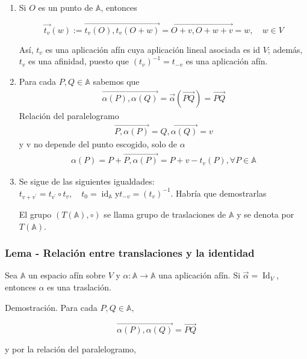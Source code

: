 \documentclass[12pt, a4paper, ones, notitlepage, openany,titlepage]{article}
\begin{document}
\begin{enumerate}
\item Si $O$ es un punto de $\mathbb{A}$, entonces

$$
\overrightarrow{t_{v}}(w):=\overrightarrow{t_{v}(O), t_{v}(O+w)}=\overrightarrow{O+v, O+w+v}=w, \quad w \in V
$$

Así, $t_{v}$ es una aplicación afín cuya aplicación lineal asociada es id $V$; además, $t_{v}$ es una afinidad, puesto que $\left(t_{v}\right)^{-1}=t_{-v}$ es una aplicación afín.

\item Para cada $P,Q\in\mathbb{A}$ sabemos que
\begin{gather*}
	\overrightarrow{\alpha(P),\alpha(Q)}=\vec{\alpha}(\overrightarrow{PQ}) = \overrightarrow{PQ}
\end{gather*}
Relación del paralelogramo
\begin{gather*}
	\overrightarrow{P,\alpha(P)} = \overrightarrow{Q,\alpha(Q)} = v
\end{gather*}
y v no depende del punto escogido, solo de $\alpha$
\begin{gather*}
	\alpha(P) = P+\overrightarrow{P,\alpha(P)} = P + v - t_{v}(P),\forall P\in\mathbb{A}
\end{gather*}

\item Se sigue de las siguientes igualdades: $t_{v+v^{\prime}}=t_{v^{\prime}} \circ t_{v}, \quad t_{0}=\operatorname{id}_{\mathbb{A}} \mathrm{y} t_{-v}=\left(t_{v}\right)^{-1}$. Habría que demostrarlas

El grupo $(T(\mathbb{A}), \circ)$ se llama grupo de traslaciones de $\mathbb{A}$ y se denota por $T(\mathbb{A})$.

\end{enumerate}


\subsubsection{Lema - Relación entre translaciones y la identidad}
Sea $\mathbb{A}$ un espacio afín sobre $V$ y $\alpha: \mathbb{A} \rightarrow \mathbb{A}$ una aplicación afín. Si $\vec{\alpha}=\operatorname{Id}_{V}$, entonces $\alpha$ es una traslación.

Demostración. Para cada $P, Q \in \mathbb{A}$,

$$
\overrightarrow{\alpha(P), \alpha(Q)}=\overrightarrow{P Q}
$$

y por la relación del paralelogramo,
\end{document}
